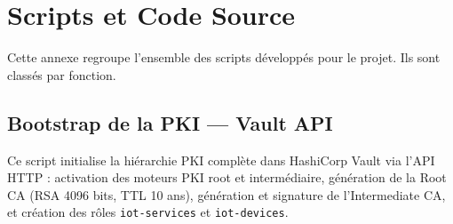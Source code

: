 \chapter{Scripts et Code Source}
\label{annexe:scripts}

Cette annexe regroupe l'ensemble des scripts développés pour le projet. Ils sont classés par fonction.

\section{Bootstrap de la PKI --- Vault API}
\label{sec:script_pki}

Ce script initialise la hiérarchie PKI complète dans HashiCorp Vault via l'API HTTP : activation des moteurs PKI root et intermédiaire, génération de la Root CA (RSA 4096 bits, TTL 10 ans), génération et signature de l'Intermediate CA, et création des rôles \texttt{iot-services} et \texttt{iot-devices}.

